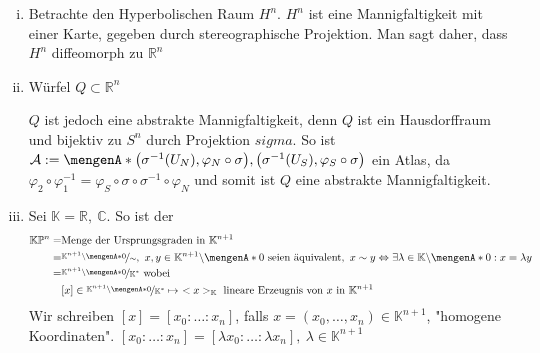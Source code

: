 \begin{enumerate}[(i)]
		\item Betrachte den Hyperbolischen Raum $H^n$.
		$H^n$ ist eine Mannigfaltigkeit mit einer Karte, gegeben durch stereographische Projektion. Man sagt daher, dass $H^n$ diffeomorph zu $\mathds{R}^n$
		\item Würfel $Q\subset \mathds{R}^n$
		\begin{figure}[H]
		\end{figure}
		$Q$ ist jedoch eine abstrakte Mannigfaltigkeit, denn $Q$ ist ein Hausdorffraum und bijektiv zu $S^n$ durch Projektion $sigma$. So ist $\mathcal{A} := \set{\enbrace*{\sigma^{-1}(U_N),\varphi_N \circ \sigma},\enbrace*{\sigma^{-1}(U_S),\varphi_S \circ \sigma}}$ ein Atlas, da $\varphi_2 \circ \varphi_1^{-1} = \varphi_S \circ \sigma \circ \sigma^{-1} \circ \varphi_N$ und somit ist $Q$ eine abstrakte Mannigfaltigkeit.
		\item Sei $\mathds{K} = \mathds{R},\ \mathds{C}$. So ist der 
		\begin{align*}
			\mathds{K}\mathds{P}^n =& \text{Menge der Ursprungsgraden in $\mathds{K}^{n+1}$}\\
			=& \nicefrac{\mathds{K}^{n+1}\backslash \set{0}}{\sim},\ x,y\in \mathds{K}^{n+1}\backslash \set{0}\ \text{seien äquivalent},\ x\sim y \Leftrightarrow \exists \lambda\in \mathds{K}\backslash \set{0}: x = \lambda y\\
			=& \nicefrac{\mathds{K}^{n+1}\backslash \set{0}}{\mathds{K}^*}\ \text{wobei}\\
			&[x]\in \nicefrac{\mathds{K}^{n+1}\backslash \set{0}}{\mathds{K}^*} \mapsto\ <x>_{\mathds{K}}\ \text{lineare Erzeugnis von $x$ in $\mathds{K}^{n+1}$}
		\end{align*}
		Wir schreiben $[x] = [x_0:\ldots:x_n]$, falls $x=(x_0,\ldots,x_n)\in \mathds{K}^{n+1}$, "homogene Koordinaten".
		 $[x_0:\ldots:x_n] = [\lambda x_0:\ldots:\lambda x_n],\ \lambda \in \mathds{K}^{n+1}$

\end{enumerate}

